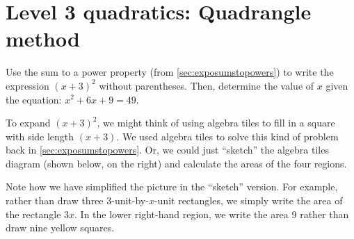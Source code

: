 \section{Level 3 quadratics: Quadrangle method}

\begin{boxexplore}
Use the sum to a power property (from \cref{sec:exposumstopowers}) to write the expression $(x+3)^2$ without parentheses. Then, determine the value of $x$ given the equation: $x^2+6x+9 = 49$.
\end{boxexplore} %

To expand $(x+3)^2$, we might think of using algebra tiles to fill in a square with side length $(x+3)$. We used algebra tiles to solve this kind of problem back in \cref{sec:exposumstopowers}. Or, we could just ``sketch'' the algebra tiles diagram (shown below, on the right) and calculate the areas of the four regions.

\begin{minipage}{0.49\linewidth}
\centering
{}
\end{minipage}
\begin{minipage}{0.49\textwidth}
\end{minipage}

Note how we have simplified the picture in the ``sketch'' version. For example, rather than draw three 3-unit-by-$x$-unit rectangles, we simply write the area of the rectangle $3x$. In the lower right-hand region, we write the area 9 rather than draw nine yellow squares.

